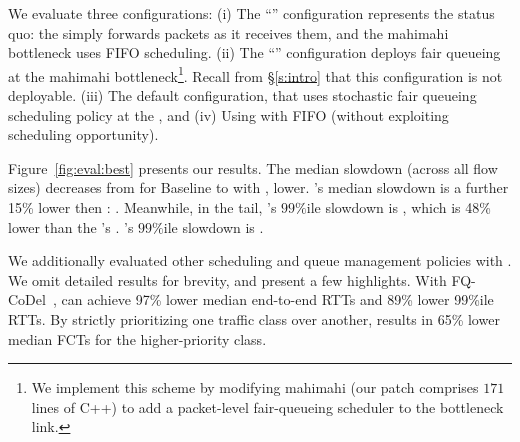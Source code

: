 We evaluate three configurations: 
(i) The ``\baseline'' configuration represents the status quo: the \inbox simply forwards packets as it receives them, and the mahimahi bottleneck uses FIFO scheduling.
(ii) The ``\optimal'' configuration deploys fair queueing
at the mahimahi bottleneck\footnote{
We implement this scheme by modifying mahimahi (our patch comprises $171$ lines of C++) to add a packet-level fair-queueing scheduler to the bottleneck link.}. 
Recall from \S\ref{s:intro} that this configuration is not deployable.
(iii) The default \name configuration, that uses stochastic fair queueing~\cite{sfq} scheduling policy at the \inbox, and (iv) Using \name with FIFO (without exploiting scheduling opportunity).

Figure~\ref{fig:eval:best} presents our results. 
The median slowdown (across all flow sizes) decreases from \overviewBenefitsBaselineMedian 
for Baseline to \overviewBenefitsBundlerMedian 
with \name, \overviewBenefitsBundlerMedianImprovement
lower. 
\optimal's median slowdown is a further 15\% lower then \name: \overviewBenefitsOptimalMedian.
Meanwhile, in the tail, \name's $99\%$ile slowdown is \overviewBenefitsBundlerTail, which is 48\% lower than the \baseline's \overviewBenefitsBaselineTail. \optimal's $99\%$ile slowdown is \overviewBenefitsOptimalTail.

 We additionally evaluated other scheduling and queue management policies with \name. We omit detailed results for brevity, and present a few highlights. With FQ-CoDel~\cite{fq-codel}, \name can achieve 97\% lower median end-to-end RTTs and 89\% lower 99\%ile RTTs.  By strictly prioritizing one traffic class over another, \name results in 65\% lower median FCTs for the higher-priority class. 

